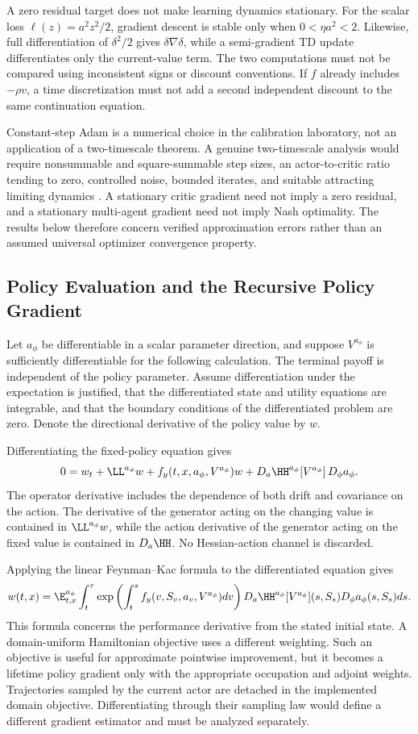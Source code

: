 A zero residual target does not make learning dynamics stationary. For the scalar loss $\ell(z)=a^2z^2/2$, gradient descent is stable only when $0<\eta a^2<2$. Likewise, full differentiation of $\delta^2/2$ gives $\delta\nabla\delta$, while a semi-gradient TD update differentiates only the current-value term. The two computations must not be compared using inconsistent signs or discount conventions. If $f$ already includes $-\rho v$, a time discretization must not add a second independent discount to the same continuation equation.

Constant-step Adam is a numerical choice in the calibration laboratory, not an application of a two-timescale theorem. A genuine two-timescale analysis would require nonsummable and square-summable step sizes, an actor-to-critic ratio tending to zero, controlled noise, bounded iterates, and suitable attracting limiting dynamics \citep{borkar2024}. A stationary critic gradient need not imply a zero residual, and a stationary multi-agent gradient need not imply Nash optimality. The results below therefore concern verified approximation errors rather than an assumed universal optimizer convergence property.

\subsection{Policy Evaluation and the Recursive Policy Gradient}
Let $a_\phi$ be differentiable in a scalar parameter direction, and suppose $V^{a_\phi}$ is sufficiently differentiable for the following calculation. The terminal payoff is independent of the policy parameter. Assume differentiation under the expectation is justified, that the differentiated state and utility equations are integrable, and that the boundary conditions of the differentiated problem are zero. Denote the directional derivative of the policy value by $w$.

Differentiating the fixed-policy equation gives
\[
 0=w_t+\LL^{a_\phi}w+f_y(t,x,a_\phi,V^{a_\phi})w
  +D_a\HH^{a_\phi}[V^{a_\phi}]\,D_\phi a_\phi.
\]
The operator derivative includes the dependence of both drift and covariance on the action. The derivative of the generator acting on the changing value is contained in $\LL^{a_\phi}w$, while the action derivative of the generator acting on the fixed value is contained in $D_a\HH$. No Hessian-action channel is discarded.

Applying the linear Feynman--Kac formula to the differentiated equation gives
\[
 w(t,x)=\E_{t,x}^{a_\phi}\int_t^\tau
 \exp\left(\int_t^s f_y(v,S_v,a_v,V^{a_\phi})dv\right)
 D_a\HH^{a_\phi}[V^{a_\phi}](s,S_s)D_\phi a_\phi(s,S_s)ds.
\]
This formula concerns the performance derivative from the stated initial state. A domain-uniform Hamiltonian objective uses a different weighting. Such an objective is useful for approximate pointwise improvement, but it becomes a lifetime policy gradient only with the appropriate occupation and adjoint weights. Trajectories sampled by the current actor are detached in the implemented domain objective. Differentiating through their sampling law would define a different gradient estimator and must be analyzed separately.

